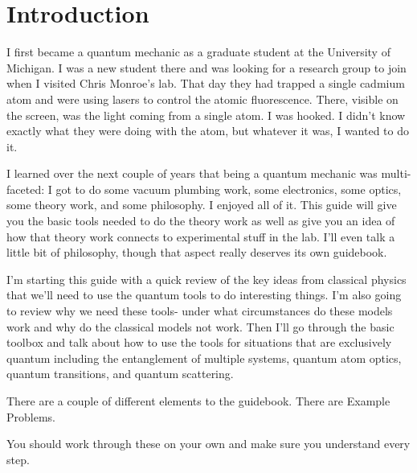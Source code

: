 \documentclass[notitlepage,oneside,openany]{tufte-book}
\begin{document}
\hypersetup{pageanchor=true}

\chapter*{Introduction} %

I first became a quantum mechanic as a graduate student at the University of Michigan. I was a new student there and was looking for a research group to join when I visited Chris Monroe's lab. That day they had trapped a single cadmium atom and were using lasers to control the atomic fluorescence. There, visible on the screen, was the light coming from a single atom. I was hooked.  I didn't know exactly what they were doing with the atom, but whatever it was, I wanted to do it.

I learned over the next couple of years that being a quantum mechanic was multi-faceted: I got to do some vacuum plumbing work, some electronics, some optics, some theory work, and some philosophy. I enjoyed all of it. This guide will give you the basic tools needed to do the theory work as well as give you an idea of how that theory work connects to experimental stuff in the lab. I'll even talk a little bit of philosophy, though that aspect really deserves its own guidebook.

I'm starting this guide with a quick review of the key ideas from classical physics that we'll need to use the quantum tools to do interesting things. I'm also going to review why we need these tools- under what circumstances do these models work and why do the classical models not work. Then I'll go through the basic toolbox and talk about how to use the tools for situations that are exclusively quantum including the entanglement of multiple systems, quantum atom optics, quantum transitions, and quantum scattering.

There are a couple of different elements to the guidebook. There are Example Problems.

\begin{example} You should work through these on your own and make sure you understand every step.
\end{example}
\end{document}

